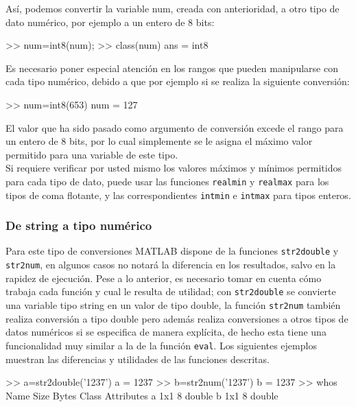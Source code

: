 Así, podemos convertir la variable num, creada con anterioridad, a otro
tipo de dato numérico, por ejemplo a un entero de 8 bits:

\begin{matlab}
>> num=int8(num);
>> class(num)
ans =
int8
\end{matlab}

Es necesario poner especial atención en los rangos que pueden
manipularse con cada tipo numérico, debido a que por ejemplo si se
realiza la siguiente conversión:

\begin{matlab}
>> num=int8(653)
num =
  127
\end{matlab}

El valor que ha sido pasado como argumento de conversión excede el rango
para un entero de 8 bits, por lo cual simplemente se le asigna el máximo
valor permitido para una variable de este tipo. \\

Si requiere verificar por usted mismo los valores máximos y mínimos
permitidos para cada tipo de dato, puede usar las funciones
\texttt{realmin} y \texttt{realmax} para los tipos de coma flotante, y
las correspondientes \texttt{intmin} e \texttt{intmax} para tipos
enteros.

\subsubsection{De string a tipo numérico}

Para este tipo de conversiones MATLAB dispone de la funciones
\texttt{str2double} y \texttt{str2num}, en algunos casos no notará la
diferencia en los resultados, salvo en la rapidez de ejecución. Pese a
lo anterior, es necesario tomar en cuenta cómo trabaja cada función y
cual le resulta de utilidad; con \texttt{str2double} se convierte una
variable tipo string en un valor de tipo double, la función
\texttt{str2num} también realiza conversión a tipo double pero además
realiza conversiones a otros tipos de datos numéricos si se especifica
de manera explícita, de hecho esta tiene una funcionalidad muy similar a
la de la función \texttt{eval}. Los siguientes ejemplos muestran las
diferencias y utilidades de las funciones descritas.

\begin{matlab}
>> a=str2double('1237')
a =
        1237
>> b=str2num('1237')
b =
        1237
>> whos
  Name      Size            Bytes  Class     Attributes
  a         1x1                 8  double              
  b         1x1                 8  double     
\end{matlab}


